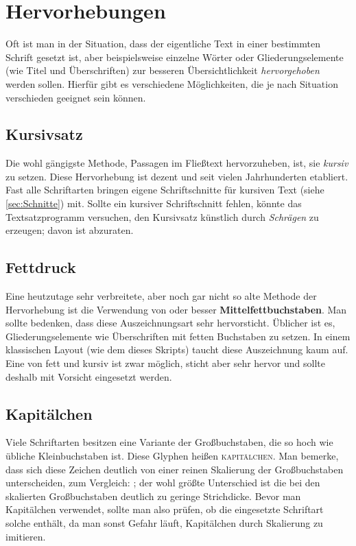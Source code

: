 \chapter{Hervorhebungen}
\label{ch:Emph}

Oft ist man in der Situation, dass der eigentliche Text in einer bestimmten
Schrift gesetzt ist, aber beispielsweise einzelne Wörter oder
Gliederungselemente (wie Titel und Überschriften) zur besseren Übersichtlichkeit
\emph{hervorgehoben} werden sollen. Hierfür gibt es verschiedene Möglichkeiten, die
je nach Situation verschieden geeignet sein können.

\section{Kursivsatz}

Die wohl gängigste Methode, Passagen
im Fließtext hervorzuheben, ist, sie \emph{kursiv} zu setzen. Diese Hervorhebung
ist dezent und seit vielen Jahrhunderten etabliert. Fast alle Schriftarten
bringen eigene Schriftschnitte für kursiven Text (siehe \cref{sec:Schnitte})
mit. Sollte ein kursiver Schriftschnitt fehlen, könnte das Textsatzprogramm
versuchen, den Kursivsatz künstlich durch \textsl{Schrägen} zu erzeugen; davon
ist abzuraten.

\section{Fettdruck}

Eine heutzutage sehr verbreitete,
aber noch gar nicht so alte Methode der Hervorhebung ist die Verwendung von
{\selectfont {Fett-}} oder besser
\textbf{Mittelfettbuchstaben}. Man sollte bedenken, dass diese Auszeichnungsart
sehr hervorsticht. Üblicher ist es, Gliederungselemente wie Überschriften mit
fetten Buchstaben zu setzen. In einem klassischen Layout (wie dem dieses
Skripts) taucht diese Auszeichnung kaum auf. Eine
\emph{{\selectfont{Kombination}}} von fett und kursiv ist zwar
möglich, sticht aber sehr hervor und sollte deshalb mit Vorsicht eingesetzt
werden.

\section{Kapitälchen}

Viele Schriftarten besitzen eine
Variante der Großbuchstaben, die so hoch wie übliche Kleinbuchstaben ist. Diese
Glyphen heißen \textsc{kapitälchen}. Man bemerke, dass sich diese Zeichen
deutlich von einer reinen Skalierung der Großbuchstaben unterscheiden, zum
Vergleich: ; der wohl größte Unterschied ist die bei
den skalierten Großbuchstaben deutlich zu geringe Strichdicke. Bevor man
Kapitälchen verwendet, sollte man also prüfen, ob die eingesetzte Schriftart
solche enthält, da man sonst Gefahr läuft, Kapitälchen durch Skalierung zu
imitieren.

